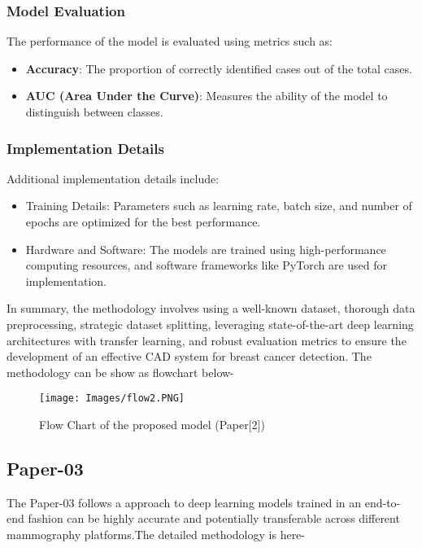 \documentclass[12]{article}
\begin{document}
\subsubsection{Model Evaluation}

The performance of the model is evaluated using metrics such as:
\begin{itemize}
    \item \textbf{Accuracy}: The proportion of correctly identified cases out of the total cases.
    \item \textbf{AUC (Area Under the Curve)}: Measures the ability of the model to distinguish between classes.
\end{itemize}

\subsubsection{Implementation Details}

Additional implementation details include:
\begin{itemize}
    \item {Training Details}: Parameters such as learning rate, batch size, and number of epochs are optimized for the best performance.
    \item {Hardware and Software}: The models are trained using high-performance computing resources, and software frameworks like PyTorch are used for implementation.
\end{itemize}


In summary, the methodology involves using a well-known dataset, thorough data preprocessing, strategic dataset splitting, leveraging state-of-the-art deep learning architectures with transfer learning, and robust evaluation metrics to ensure the development of an effective CAD system for breast cancer detection.
\newline
The methodology can be show as flowchart below-
\begin{figure}[hbt!]
    \centering
    \texttt{[image: Images/flow2.PNG]}
    \caption{Flow Chart of the proposed model (Paper[2])}
    \label{diagram3}
\end{figure}

\subsection{Paper-03}
The Paper-03 follows a approach to deep learning models trained in an end-to-end fashion can be highly accurate and potentially transferable across different mammography platforms.The detailed methodology is here-
\end{document}
